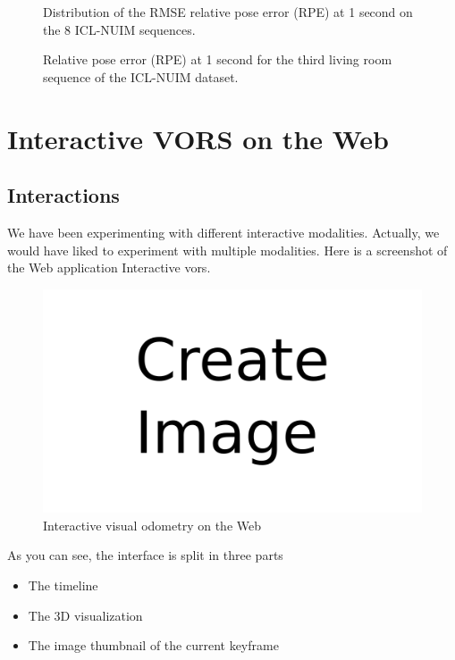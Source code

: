 \begin{figure}[ht]
	\centering
	
	\caption{Distribution of the RMSE relative pose error (RPE) at 1 second
	on the 8 ICL-NUIM sequences.}%
	\label{fig:rpe_rmse_icl}
\end{figure}

\begin{figure}[ht]
	\centering
	
	\caption{Relative pose error (RPE) at 1 second for the third
	living room sequence of the ICL-NUIM dataset.}%
	\label{fig:rpe_icl3}
\end{figure}

\clearpage
\section{Interactive VORS on the Web}%
\label{sec:interactive-vors}


\subsection{Interactions}%
\label{sub:interactions}

We have been experimenting with different interactive modalities.
Actually, we would have liked to experiment with multiple modalities.
Here is a screenshot of the Web application Interactive vors.

\begin{figure}[h]
	\centering
	\includegraphics[width=\linewidth]{assets/img/todo.png}
	\caption{Interactive visual odometry on the Web}%
	\label{fig:interactive_vors}
\end{figure}

As you can see, the interface is split in three parts

\begin{itemize}
	\item The timeline
	\item The 3D visualization
	\item The image thumbnail of the current keyframe
\end{itemize}

